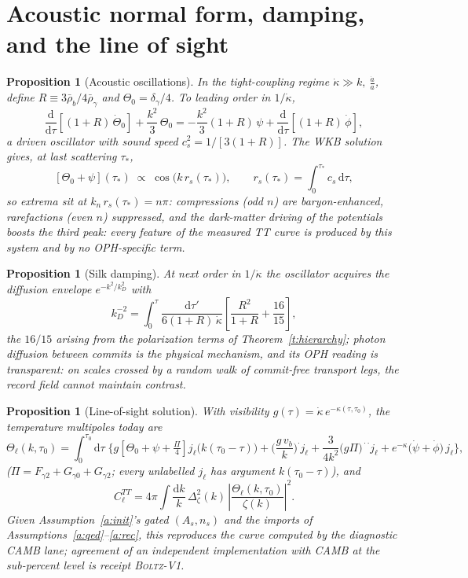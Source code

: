 \documentclass[11pt]{article}
\newtheorem{proposition}[theorem]{Proposition}
\theoremstyle{remark}
\newcommand{\Dd}{\mathrm{d}}
\newcommand{\ah}{\frac{\dot a}{a}}
\newcommand{\kdot}{\dot\kappa}
\begin{document}
\section{Acoustic normal form, damping, and the line of sight}

\begin{proposition}[Acoustic oscillations]\label{p:acoustic}
In the tight-coupling regime $\kdot\gg k,\ \ah$, define
$R\equiv 3\bar\rho_b/4\bar\rho_\gamma$ and $\Theta_0=\delta_\gamma/4$. To
leading order in $1/\kdot$,
\[
\frac{\Dd}{\Dd\tau}\!\left[(1+R)\,\dot\Theta_0\right]
+\frac{k^2}{3}\,\Theta_0
=-\frac{k^2}{3}(1+R)\,\psi
+\frac{\Dd}{\Dd\tau}\!\left[(1+R)\,\dot\phi\right],
\]
a driven oscillator with sound speed $c_s^2=1/[3(1+R)]$. The WKB solution
gives, at last scattering $\tau_\ast$,
\[
[\Theta_0+\psi](\tau_\ast)\;\propto\;\cos\!\big(k\,r_s(\tau_\ast)\big),
\qquad
r_s(\tau_\ast)=\int_0^{\tau_\ast}\!c_s\,\Dd\tau,
\]
so extrema sit at $k_n\,r_s(\tau_\ast)=n\pi$: compressions (odd $n$) are
baryon-enhanced, rarefactions (even $n$) suppressed, and the dark-matter
driving of the potentials boosts the third peak: every feature of the
measured TT curve is produced by this system and by no OPH-specific term.
\end{proposition}

\begin{proposition}[Silk damping]\label{p:damping}
At next order in $1/\kdot$ the oscillator acquires the diffusion envelope
$e^{-k^2/k_D^2}$ with
\[
k_D^{-2}=\int_0^{\tau}\frac{\Dd\tau'}{6(1+R)\,\kdot}
\left[\frac{R^2}{1+R}+\frac{16}{15}\right],
\]
the $16/15$ arising from the polarization terms of
Theorem~\ref{t:hierarchy}; photon diffusion between commits is the physical
mechanism, and its OPH reading is transparent: on scales crossed by a random
walk of commit-free transport legs, the record field cannot maintain
contrast.
\end{proposition}

\begin{proposition}[Line-of-sight solution]\label{p:los}
With visibility $g(\tau)=\kdot\,e^{-\kappa(\tau,\tau_0)}$, the temperature
multipoles today are
\[
\Theta_\ell(k,\tau_0)=\int_0^{\tau_0}\!\Dd\tau\;
\Big\{
g\left[\Theta_0+\psi+\tfrac{\Pi}{4}\right]
j_\ell\big(k(\tau_0-\tau)\big)
+\Big(\frac{g\,v_b}{k}\Big)^{\!\cdot} j_\ell
+\frac{3}{4k^2}\big(g\Pi\big)^{\!\cdot\cdot}j_\ell
+e^{-\kappa}\big(\dot\psi+\dot\phi\big)\,j_\ell
\Big\},
\]
($\Pi=F_{\gamma2}+G_{\gamma0}+G_{\gamma2}$; every unlabelled
$j_\ell$ has argument $k(\tau_0-\tau)$), and
\[
C_\ell^{TT}=4\pi\!\int\!\frac{\Dd k}{k}\,
\Delta_\zeta^2(k)\,\left|\frac{\Theta_\ell(k,\tau_0)}{\zeta(k)}\right|^2 .
\]
Given Assumption~\ref{a:init}'s gated $(A_s,n_s)$ and the imports of
Assumptions~\ref{a:qed}--\ref{a:rec}, this reproduces the curve computed by
the diagnostic CAMB lane; agreement of an independent implementation with
CAMB at the sub-percent level is receipt \textsc{Boltz-V1}.
\end{proposition}
\end{document}
